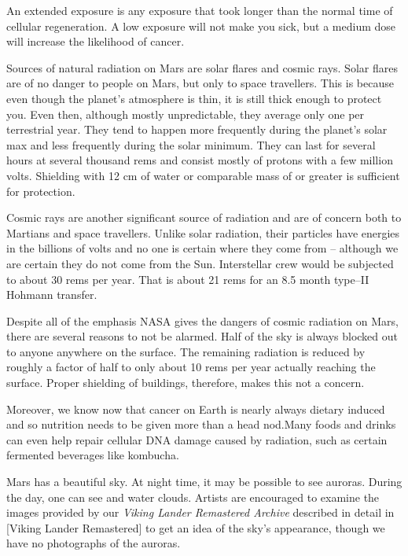 An extended exposure is any exposure that took longer than the normal time of cellular regeneration. A low exposure will not make you sick, but a medium dose will increase the likelihood of cancer.

Sources of natural radiation on Mars are solar flares and cosmic rays. Solar flares are of no danger to people on Mars, but only to space travellers. This is because even though the planet's atmosphere is thin, it is still thick enough to protect you. Even then, although mostly unpredictable, they average only one per terrestrial year. They tend to happen more frequently during the planet's solar max and less frequently during the solar minimum. They can last for several hours at several thousand rems and consist mostly of protons with a few million volts. Shielding with 12 cm of water or comparable mass of  or greater is sufficient for protection.

Cosmic rays are another significant source of radiation and are of concern both to Martians and space travellers. Unlike solar radiation, their particles have energies in the billions of volts and no one is certain where they come from -- although we are certain they do not come from the Sun. Interstellar crew would be subjected to about 30 rems per year. That is about 21 rems for an 8.5 month type--II Hohmann transfer.

Despite all of the emphasis NASA gives the dangers of cosmic radiation on Mars, there are several reasons to not be alarmed. Half of the sky is always blocked out to anyone anywhere on the surface. The remaining radiation is reduced by roughly a factor of half to only about 10 rems per year actually reaching the surface. Proper shielding of buildings, therefore, makes this not a concern.

Moreover, we know now that cancer on Earth is nearly always dietary induced and so nutrition needs to be given more than a head nod. Many foods and drinks can even help repair cellular DNA damage caused by radiation, such as certain fermented beverages like kombucha.\footnotecite[cavusoglu2009]

Mars has a beautiful sky. At night time, it may be possible to see auroras. During the day, one can see  and water clouds. Artists are encouraged to examine the images provided by our {\it Viking Lander Remastered Archive} described in detail in [Viking Lander Remastered] to get an idea of the sky's appearance, though we have no photographs of the auroras.

